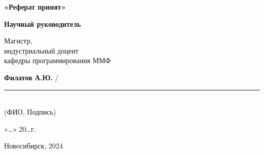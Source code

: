 \hspace*{\fill} %
\begin{minipage}[t]{0.5\textwidth}
  \textbf{«Реферат принят»}
  
  \vspace{0.5cm} %
  
  \textbf{Научный руководитель}
  
  \vspace{0.5cm} %
  
  Магистр, \\
  индустриальный доцент \\
  кафедры программирования ММФ
  
  \vspace{1cm} %
  \textbf{Филатов А.Ю.} / \rule{4cm}{0.4pt} \\ %
  \small (ФИО, Подпись) %

  \vspace{1cm} %

  «\ldots»\makebox[7em]{\dotfill} 20\ldots г. %
\end{minipage}

\vfill %

\begin{center}
Новосибирск, 2024
\end{center}

